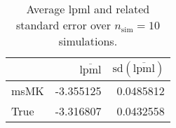 \begin{table}[H]

\caption{Average lpml and related standard error over $n_{\text{sim}} = 10$ simulations.}
\centering
\begin{tabular}[t]{lrr}
\toprule
  & $\overbar{\text{lpml}}$ & $\text{sd}(\overbar{\text{lpml}})$\\
\midrule
msMK & -3.355125 & 0.0485812\\
True & -3.316807 & 0.0432558\\
\bottomrule
\end{tabular}
\end{table}